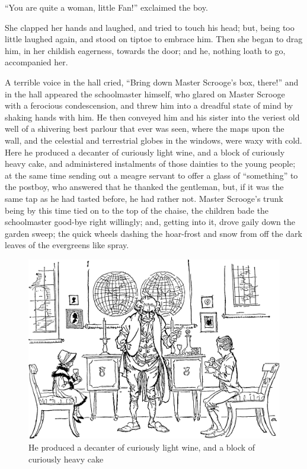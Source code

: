 \documentclass[paper=5.5in:8.5in,BCOR=7mm,twoside,DIV=calc,12pt,usegeometry]{scrbook} %
\begin{document}
\enquote{You are quite a woman, little Fan!} exclaimed the boy.

She clapped her hands and laughed, and tried to touch his head; but, being too little laughed again, and stood on tiptoe to embrace him. Then she began to drag him, in her childish eagerness, towards the door; and he, nothing loath to go, accompanied her.

A terrible voice in the hall cried, \enquote{Bring down Master Scrooge's box, there!} and in the hall appeared the schoolmaster himself, who glared on Master Scrooge with a ferocious condescension, and threw him into a dreadful state of mind by shaking hands with him. He then conveyed him and his sister into the veriest old well of a shivering best parlour that ever was seen, where the maps upon the wall, and the celestial and terrestrial globes in the windows, were waxy with cold. Here he produced a decanter of curiously light wine, and a block of curiously heavy cake, and administered instalments of those dainties to the young people; at the same time sending out a meagre servant to offer a glass of \enquote{something} to the postboy, who answered that he thanked the gentleman, but, if it was the same tap as he had tasted before, he had rather not. Master Scrooge's trunk being by this time tied on to the top of the chaise, the children bade the schoolmaster good-bye right willingly; and, getting into it, drove gaily down the garden sweep; the quick wheels dashing the hoar-frost and snow from off the dark leaves of the evergreens like spray.

\begin{figure}[tbph]
\begin{minipage}[c]{\linewidth}
\includegraphics[width=\linewidth]{cake}
\caption*{He produced a decanter of curiously light wine, and a block of curiously heavy cake}
\end{minipage}
\end{figure}
\end{document}
